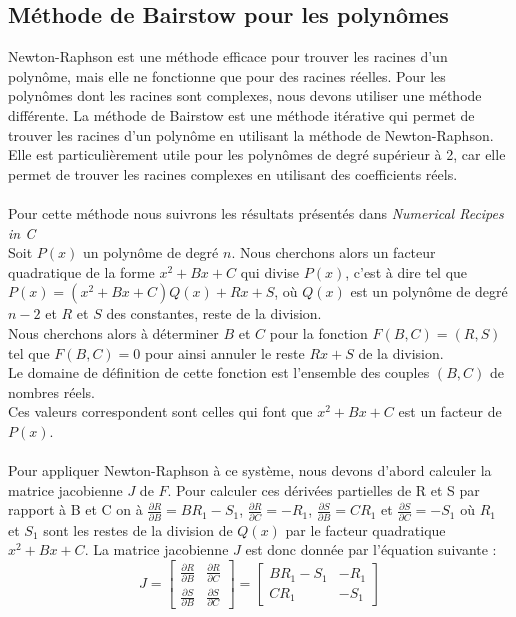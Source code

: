 \documentclass{article}
\begin{document}
\subsection{Méthode de Bairstow pour les polynômes}
Newton-Raphson est une méthode efficace pour trouver les racines d'un polynôme, mais elle ne fonctionne que pour des racines réelles. Pour les polynômes dont les racines sont complexes, nous devons utiliser une méthode différente. La méthode de Bairstow est une méthode itérative qui permet de trouver les racines d'un polynôme en utilisant la méthode de Newton-Raphson. Elle est particulièrement utile pour les polynômes de degré supérieur à 2, car elle permet de trouver les racines complexes en utilisant des coefficients réels. \\ \\
Pour cette méthode nous suivrons les résultats présentés dans \textit{Numerical Recipes in C}\\
Soit \(P(x)\) un polynôme de degré \(n\). Nous cherchons alors un facteur quadratique de la forme \(x^2 + Bx + C\) qui divise \(P(x)\), c'est à dire tel que \(P(x) = (x^2 + Bx + C)Q(x) +Rx + S\), où \(Q(x)\) est un polynôme de degré \(n-2\) et \(R\) et \(S\) des constantes, reste de la division.\\

Nous cherchons alors à déterminer \(B\) et \(C\) pour la fonction \(F(B,C) = (R,S)\) tel que \(F(B,C) = 0\) pour ainsi annuler le reste \(Rx + S\) de la division.\\ Le domaine de définition de cette fonction est l'ensemble des couples \((B, C)\) de nombres réels.\\
Ces valeurs correspondent sont celles qui font que \(x^2 + Bx + C\) est un facteur de \(P(x)\).\\ \\
Pour appliquer Newton-Raphson à ce système, nous devons d'abord calculer la matrice jacobienne \(J\) de \(F\). Pour calculer ces dérivées partielles de R et S par rapport à B et C on à \(\frac{\partial R}{\partial B} = BR_1 - S_1\), \(\frac{\partial R}{\partial C} = -R_1\), \(\frac{\partial S}{\partial B} = CR_1\) et \(\frac{\partial S}{\partial C} = -S_1\) où \(R_1\) et \(S_1\) sont les restes de la division de \(Q(x)\) par le facteur quadratique \(x^2 + Bx + C\). La matrice jacobienne $J$ est donc donnée par l'équation suivante : 
\begin{equation}
J = \begin{bmatrix}
\frac{\partial R}{\partial B} & \frac{\partial R}{\partial C} \\
\frac{\partial S}{\partial B} & \frac{\partial S}{\partial C}
\end{bmatrix}
=
\begin{bmatrix}
BR_1 - S_1 & -R_1 \\
CR_1 & -S_1
\end{bmatrix}
\label{eq:jacobian}
\end{equation}
\end{document}
